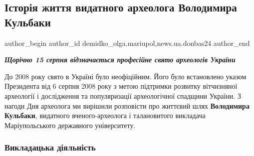  
 
 
 
 
 
\subsection{Історія життя видатного археолога Володимира Кульбаки}
\label{sec:15_08_2022.stz.news.ua.donbas24.1.istoria_zhyttja_vydatnogo_arheologa_volodymyra_kulbaky}
 
\ifcmt
 author_begin
   author_id demidko_olga.mariupol,news.ua.donbas24
 author_end
\fi

\begin{center}
  \em\color{blue}\bfseries\Large
Щорічно 15 серпня відзначається професійне свято археологів України 
\end{center}

До 2008 року свято в Україні було неофіційним. Його було встановлено указом
Президента від 6 серпня 2008 року з метою підтримки розвитку вітчизняної
археології і дослідження та популяризації археологічної спадщини України. З
нагоди Дня археолога ми вирішили розповісти про життєвий шлях \textbf{Володимира
Кульбаки}, видатного вченого-археолога і талановитого викладача Маріупольського
державного університету.



\subsubsection{Викладацька діяльність}

